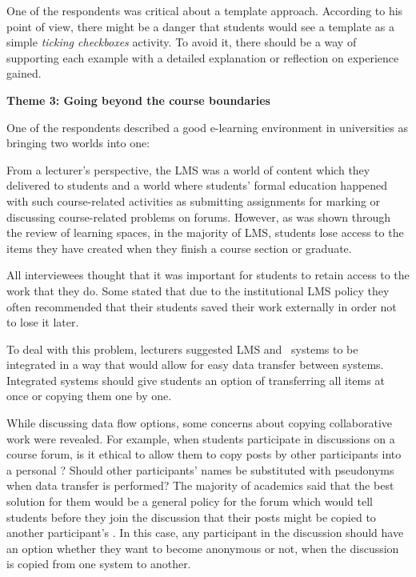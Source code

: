 One of the respondents was critical about a template approach. According to his
point of view, there might be a danger that students would see a template as a
simple \textit{ticking checkboxes} activity. To avoid it, there should be a way
of supporting each example with a detailed explanation or reflection on
experience gained.

\textbf{Theme 3: Going beyond the course boundaries}

One of the respondents described a good e-learning environment in universities
as bringing two worlds into one:


From a lecturer's perspective, the LMS was a world of content which they
delivered to students and a world where students' formal education happened with
such course-related activities as submitting assignments for marking or discussing
course-related problems on forums. However, as was shown through the review
of learning spaces, in the majority of LMS, students lose access to the items
they have created when they finish a course section or graduate.

All interviewees thought that it was important for students to retain access to
the work that they do. Some stated that due to the institutional LMS policy they
often recommended that their students saved their work externally in order not
to lose it later.

To deal with this problem, lecturers suggested LMS and \ep~systems to be
integrated in a way that would allow for easy data transfer between systems.
Integrated systems should give students an option of transferring all items at
once or copying them one by one.

While discussing data flow options, some concerns about copying collaborative
work were revealed. For example, when students participate in discussions on a
course forum, is it ethical to allow them to copy posts by other participants
into a personal \ep? Should other participants' names be substituted with
pseudonyms when data transfer is performed? The majority of academics said that
the best solution for them would be a general policy for the forum which would
tell students before they join the discussion that their posts might be copied
to another participant's \ep. In this case, any participant in the discussion
should have an option whether they want to become anonymous or not, when the
discussion is copied from one system to another.

